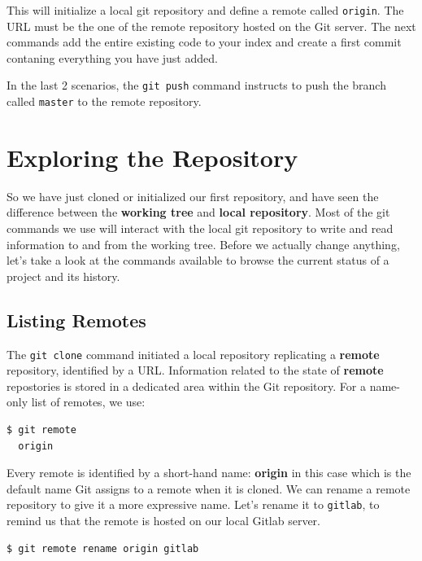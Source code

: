 \documentclass[a4paper]{../../common/tufte-latex/tufte-handout}
\begin{document}
This will initialize a local git repository and define a remote called \texttt{origin}. The URL must be the one of the remote repository hosted on the Git server. The next commands add the entire existing code to your index and create a first commit contaning everything you have just added. 

In  the last 2 scenarios, the \texttt{git push} command instructs to push the branch called \texttt{master} to the remote repository. 

\section{Exploring the Repository}

So we have just cloned or initialized our first repository, and have seen the difference between the \textbf{working tree} and \textbf{local repository}.
Most of the git commands we use will interact with the local git repository to write and read information to and from the working tree.
Before we actually change anything, let's take a look at the commands available to browse the current status of a project and its history.

\subsection{Listing Remotes}

The \texttt{git clone} command initiated a local repository replicating a \textbf{remote} repository, identified by a URL.
Information related to the state of \textbf{remote} repostories is stored in a dedicated area within the Git repository.
For a name-only list of remotes, we use:

\begin{lstlisting}[style=BashInputStyle]
  $ git remote
  origin
\end{lstlisting}

Every remote is identified by a short-hand name: \textbf{origin} in this case which is the default name Git assigns to a remote when it is cloned.
We can rename a remote repository to give it a more expressive name.
Let's rename it to \texttt{gitlab}, to remind us that the remote is hosted on our local Gitlab server.

\begin{lstlisting}[style=BashInputStyle]
  $ git remote rename origin gitlab
\end{lstlisting}
\end{document}
